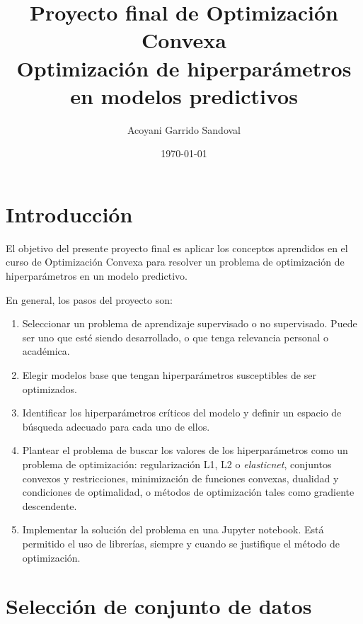 \documentclass[spanish]{article}
\begin{document}
\title{Proyecto final de Optimización Convexa \\ Optimización de hiperparámetros en modelos predictivos}
\author{Acoyani Garrido Sandoval}
\date{\today}
\maketitle




\section{Introducción}

El objetivo del presente proyecto final es aplicar los conceptos aprendidos en el curso de Optimización Convexa para resolver un problema de optimización de hiperparámetros en un modelo predictivo.

En general, los pasos del proyecto son:

\begin{enumerate}
   \item Seleccionar un problema de aprendizaje supervisado o no supervisado. Puede ser uno que esté siendo desarrollado, o que tenga relevancia personal o académica.
   \item Elegir modelos base que tengan hiperparámetros susceptibles de ser optimizados.
   \item Identificar los hiperparámetros críticos del modelo y definir un espacio de búsqueda adecuado para cada uno de ellos.
   \item Plantear el problema de buscar los valores de los hiperparámetros como un problema de optimización: regularización L1, L2 o \textit{elasticnet}, conjuntos convexos y restricciones, minimización de funciones convexas, dualidad y condiciones de optimalidad, o métodos de optimización tales como gradiente descendente.
   \item Implementar la solución del problema en una Jupyter notebook. Está permitido el uso de librerías, siempre y cuando se justifique el método de optimización.
\end{enumerate}




\clearpage
\section{Selección de conjunto de datos}
\end{document}
